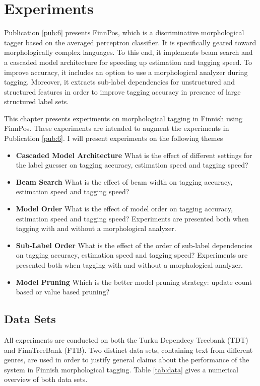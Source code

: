 \chapter{Experiments}
\label{chapter:finnpos}

Publication \ref{pub:6} presents FinnPos, which is a discriminative
morphological tagger based on the averaged perceptron classifier. It
is specifically geared toward morphologically complex languages. To this
end, it implements beam search and a cascaded model architecture for
speeding up estimation and tagging speed. To improve accuracy, it
includes an option to use a morphological analyzer during
tagging. Moreover, it extracts sub-label dependencies for unstructured
and structured features in order to improve tagging accuracy in presence of
large structured label sets.

This chapter presents experiments on morphological tagging in Finnish
using FinnPos. These experiments are intended to augment the
experiments in Publication \ref{pub:6}. I will present experiments on
the following themes

\begin{itemize}
\item {\bf Cascaded Model Architecture} What is the effect of different settings for the label guesser on tagging accuracy, estimation speed and tagging speed?
\item {\bf Beam Search} What is the effect of beam width on tagging accuracy, estimation speed and tagging speed?
\item {\bf Model Order} What is the effect of model order on tagging accuracy, estimation speed and tagging speed? Experiments are presented both when tagging with and without a morphological analyzer.
\item {\bf Sub-Label Order} What is the effect of the order of sub-label dependencies on tagging accuracy, estimation speed and tagging speed? Experiments are presented both when tagging with and without a morphological analyzer.
\item {\bf Model Pruning} Which is the better model pruning strategy: update count based or value based pruning?
\end{itemize}



\section{Data Sets}
All experiments are conducted on both the Turku Dependecy Treebank
\citep{Haverinen2013} (TDT) and FinnTreeBank \citep{Voutilainen2011}
(FTB). Two distinct data sets, containing text from different genres,
are used in order to justify general claims about the performance of
the system in Finnish morphological tagging. Table \ref{tab:data} gives a
numerical overview of both data sets.


